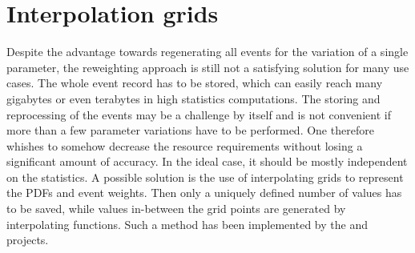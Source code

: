 \section{Interpolation grids}
Despite the advantage towards regenerating all events for the variation of a single parameter, the reweighting approach is still not a satisfying solution for many use cases.
The whole event record has to be stored, which can easily reach many gigabytes or even terabytes in high statistics computations.
The storing and reprocessing of the events may be a challenge by itself and is not convenient if more than a few parameter variations have to be performed.
One therefore whishes to somehow decrease the resource requirements without losing a significant amount of accuracy.
In the ideal case, it should be mostly independent on the statistics.
A possible solution is the use of interpolating grids to represent the PDFs and event weights.
Then only a uniquely defined number of values has to be saved, while values in-between the grid points are generated by interpolating functions.
Such a method has been implemented by the \appl{} \cite{applgrid2010} and \fnlo{} \cite{fastnlo2006,fastnlo2011} projects.

